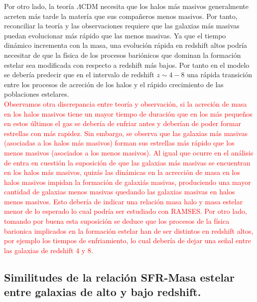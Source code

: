 \documentclass{article}
\begin{document}
Por otro lado, la teoría $\Lambda$CDM necesita que los halos más masivos generalmente acreten más tarde la matería que sus compañeros menos masivos. Por tanto, reconciliar la teoría y las observaciones requiere que las galaxias más masivas puedan evolucionar más rápido que las menos masivas. Ya que el tiempo dinámico incrementa con la masa, una evolución rápida en redshift altos podría necesitar de que la física de los procesos bariónicos que dominan la formación estelar sea modificada con respecto a redshift más bajos. Por tanto en el modelo se debería predecir que en el intervalo de redshift $z\sim 4-8$ una rápida transición entre los procesos de acreción de los halos y el rápido crecimiento de las poblaciones estelares. \\

\textcolor{red}{Observamos otra discrepancia entre teoría y observación, si la acreción de masa en los halos masivos tiene un mayor tiempo de duración que en los más pequeños en estos últimos el gas se debería de enfriar antes y deberían de poder formar estrellas con más rapidez. Sin embargo, se observa que las galaxias más masivas (asociadas a los halos más masivos) forman sus estrellas más rápido que los menos masivos (asociados a los menos masivos). Al igual que ocurre en el análisis de \cite{finkelstein2015increasing} \citep{arranz2015finkelstein} entra en cuestión la suposición de que las galaxias más masivas se encuentran en los halos más masivos, quizás las dinámicas en la acrección de masa en los halos masivos impidan la formación de galaxiás masivas, produciendo una mayor cantidad de galaxias menos masivas quedando las galaxias masivas en halos menos masivos. Esto debería de indicar una relación masa halo y masa estelar menor de lo esperado lo cual podría ser estudiado con RAMSES. Por otro lado, tomando por buena esta suposición se deduce que los procesos de la física barionica implicados en la formación estelar han de ser distintos en redshift altos, por ejemplo los tiempos de enfriamiento, lo cual debería de dejar una señal entre las galaxias de redshift 4 y 8.}\\

\subsection*{Similitudes de la relación SFR-Masa estelar entre galaxias de alto y bajo redshift.}
\end{document}
